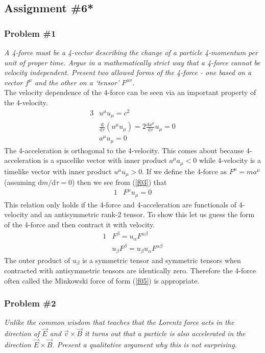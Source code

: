 \documentclass[]{article}
\numberwithin{equation}{subsection}
\begin{document}
\subsection{Assignment \#6*}
\subsubsection*{Problem \#1}
\emph{A 4-force must be a 4-vector describing the change of a particle 4-momentum per unit of proper time. Argue in a mathematically strict way that a 4-force cannot be velocity independent. Present two allowed forms of the 4-force - one based on a vector $f^{\mu}$ and the other on a `tensor' $F^{\mu\nu}$.}\\

\noindent The velocity dependence of the 4-force can be seen via an important property of the 4-velocity.
\begin{alignat}{3}
	\label{f01}	&u^{\mu}u_{\mu}=c^{2}\\
	\label{f02}	&\frac{\mathrm{d}}{\mathrm{d}\tau}(u^{\mu}u_{\mu})=2\frac{\mathrm{d}u^{\mu}}{\mathrm{d}\tau}u_{\mu}=0\\
	\label{f03}	&a^{\mu}u_{\mu}=0
\end{alignat}
The 4-acceleration is orthogonal to the 4-velocity. This comes about because 4-acceleration is a spacelike vector with inner product $a^{\mu}a_{\mu}<0$ while 4-velocity is a timelike vector with inner product $u^{\mu}u_{\mu}>0$. If we define the 4-force as $F^{\mu}=ma^{\mu}$ (assuming $\mathrm{d}m/\mathrm{d}\tau=0$) then we see from (\ref{f03}) that
\begin{alignat}{1}
	\label{f04}	&F^{\mu}u_{\mu}=0
\end{alignat}
This relation only holds if the 4-force and 4-acceleration are functionals of 4-velocity and an antisymmetric rank-2 tensor. To show this let us guess the form of the 4-force and then contract it with velocity.
\begin{alignat}{1}
	\label{f05}	&F^{\beta}=u_{\alpha}F^{\alpha\beta}\\
	\label{f06}	&u_{\beta}F^{\beta}=u_{\beta}u_{\alpha}F^{\alpha\beta}
\end{alignat}
The outer product of $u_{\beta}$ is a symmetric tensor and symmetric tensors when contracted with antisymmetric tensors are identically zero. Therefore the 4-force often called the Minkowski force of form (\ref{f05}) is appropriate.

\subsubsection*{Problem \#2}
\emph{Unlike the common wisdom that teaches that the Lorentz force acts in the direction of $\vec{E}$ and $\vec{v}\times\vec{B}$ it turns out that a particle is also accelerated in the direction $\vec{E}\times\vec{B}$. Present a qualitative argument why this is not surprising.}\\
\end{document}
